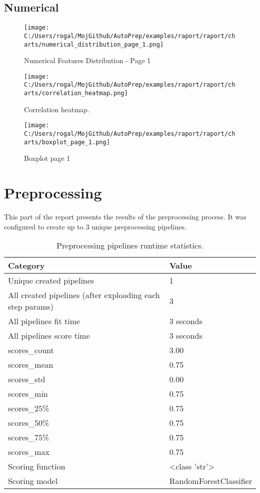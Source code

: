 \documentclass{article}%
\begin{document}
%
\subsection{Numerical}%
\label{subsec:Numerical}%

%


\begin{figure}[H]%
\centering%
\texttt{[image: C:/Users/rogal/MojGithub/AutoPrep/examples/raport/raport/charts/numerical\_distribution\_page\_1.png]}%
\caption{Numerical Features Distribution {-} Page 1}%
\end{figure}

%


\begin{figure}[H]%
\centering%
\texttt{[image: C:/Users/rogal/MojGithub/AutoPrep/examples/raport/raport/charts/correlation\_heatmap.png]}%
\caption{Correlation heatmap.}%
\end{figure}

%


\begin{figure}[H]%
\centering%
\texttt{[image: C:/Users/rogal/MojGithub/AutoPrep/examples/raport/raport/charts/boxplot\_page\_1.png]}%
\caption{Boxplot page 1}%
\end{figure}

%
\section{Preprocessing}%
\label{sec:Preprocessing}%

%
This part of the report presents the results of the preprocessing process. It was configured to create up to 3 unique preprocessing pipelines.%


\begin{table}[H]%
\begin{center}%
\begin{tabular}{l l}%
\hline%
\textbf{Category}&\textbf{Value}\\%
\hline%
Unique created pipelines&1\\%
All created pipelines (after exploading each step params)&3\\%
All pipelines fit time&3 seconds\\%
All pipelines score time&3 seconds\\%
scores\_count&3.00\\%
scores\_mean&0.75\\%
scores\_std&0.00\\%
scores\_min&0.75\\%
scores\_25\%&0.75\\%
scores\_50\%&0.75\\%
scores\_75\%&0.75\\%
scores\_max&0.75\\%
Scoring function&<class 'str'>\\%
Scoring model&RandomForestClassifier\\%
\hline%
\end{tabular}%
\end{center}%
\caption{Preprocessing pipelines runtime statistics.}%
\end{table}
\end{document}
